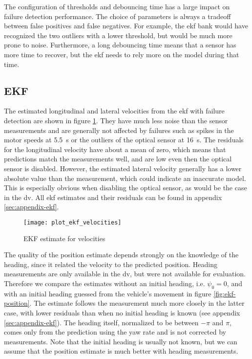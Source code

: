 The configuration of thresholds and debouncing time has a large impact on failure detection performance. The choice of parameters is always a tradeoff between false positives and false negatives. For example, the \gls{ekf} bank would have recognized the two outliers with a lower threshold, but would be much more prone to noise. Furthermore, a long debouncing time means that a sensor has more time to recover, but the \gls{ekf} needs to rely more on the model during that time.


\subsection{EKF}
The estimated longitudinal and lateral velocities from the \gls{ekf} with failure detection are shown in figure \ref{fig:ekf-velocities}. They have much less noise than the sensor measurements and are generally not affected by failures such as spikes in the motor speeds at \SI{5.5}{\second} or the outliers of the optical sensor at \SI{16}{\second}. The residuals for the longitudinal velocity have about a mean of zero, which means that predictions match the measurements well, and are low even then the optical sensor is disabled. However, the estimated lateral velocity generally has a lower absolute value than the measurement, which could indicate an inaccurate model. This is especially obvious when disabling the optical sensor, as would be the case in the \gls{dv}. All \gls{ekf} estimates and their residuals can be found in appendix \ref{sec:appendix-ekf}.

\begin{figure}[t]
	\centering
	\texttt{[image: plot\_ekf\_velocities]}%
	\caption{EKF estimate for velocities}
	\label{fig:ekf-velocities}
\end{figure}

The quality of the position estimate depends strongly on the knowledge of the heading, since it related the velocity to the predicted position. Heading measurements are only available in the \gls{dv}, but were not available for evaluation. Therefore we compare the estimates without an initial heading, i.e. $\psi_0 = 0$, and with an initial heading guessed from the vehicle's movement in figure \ref{fig:ekf-position}. The estimate follows the measurement much more closely in the latter case, with lower residuals than when no initial heading is known (see appendix \ref{sec:appendix-ekf}). The heading itself, normalized to be between $-\pi$ and $\pi$, comes only from the prediction using the yaw rate and is not corrected by measurements. Note that the initial heading is usually not known, but we can assume that the position estimate is much better with heading measurements.

